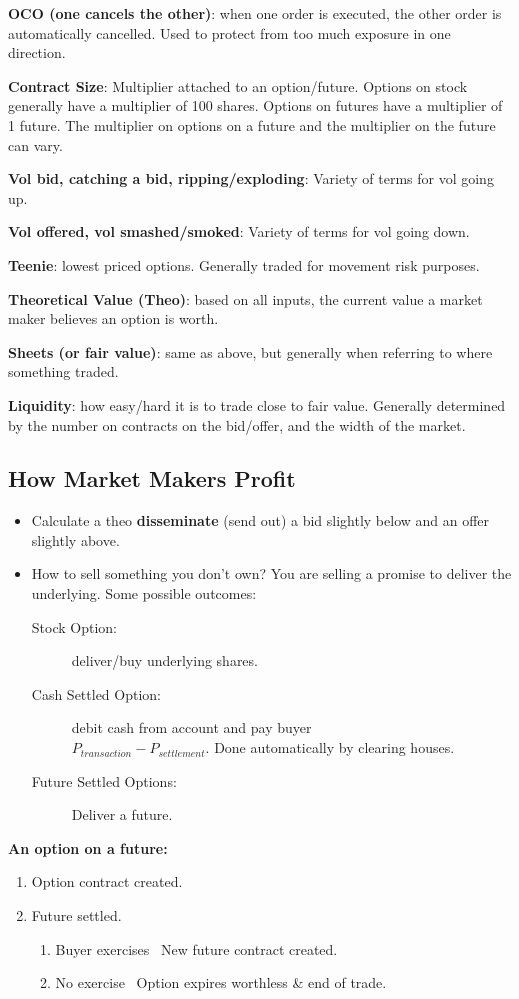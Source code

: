 \documentclass{article}
\begin{document}
\textbf{OCO (one cancels the other)}: when one order is executed, the other order
is automatically cancelled. Used to protect from too much exposure in one direction.

\textbf{Contract Size}: Multiplier attached to an option/future. Options
on stock generally have a multiplier of 100 shares. Options on futures
have a multiplier of 1 future. The multiplier on options on a future and the
multiplier on the future can vary.

\textbf{Vol bid, catching a bid, ripping/exploding}: Variety of terms for vol
going up.

\textbf{Vol offered, vol smashed/smoked}: Variety of terms for vol going down.

\textbf{Teenie}: lowest priced options. Generally traded for movement risk purposes.

\textbf{Theoretical Value (Theo)}: based on all inputs, the current value a market
maker believes an option is worth.

\textbf{Sheets (or fair value)}: same as above, but generally when referring to
where something traded.

\textbf{Liquidity}: how easy/hard it is to trade close to fair value.
Generally determined by the number on contracts on the bid/offer, and the width
of the market.

\subsection{How Market Makers Profit}
\begin{itemize}
    \item Calculate a theo \textbf{disseminate} (send out) a bid slightly below and an offer
slightly above.
    \item How to sell something you don't own? You are selling a promise to deliver
the underlying. Some possible outcomes:
\begin{description}
    \item[Stock Option:] deliver/buy underlying shares.
    \item[Cash Settled Option:] debit cash from account and pay buyer\\
    $P_{transaction} - P_{settlement}$. Done automatically by clearing houses.
    \item[Future Settled Options:] Deliver a future. 
\end{description}
\end{itemize}

\textbf{An option on a future:}
\begin{enumerate}
    \item Option contract created.
    \item Future settled.
    \begin{enumerate}
        \item Buyer exercises \textrightarrow\ New future contract created.
        \item No exercise \textrightarrow\ Option expires worthless \& end of trade.
    \end{enumerate}
\end{enumerate}
\end{document}
